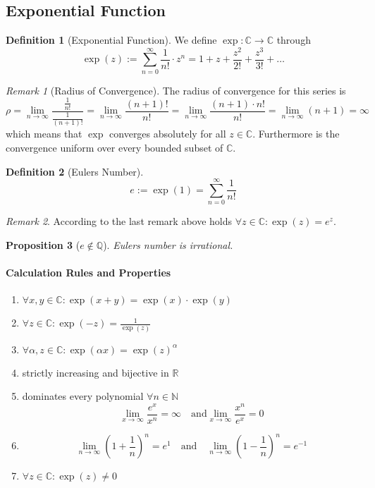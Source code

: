 \documentclass[english,titlepage]{uzhpub}
\theoremstyle{definition}
\newtheorem{definition}{Definition}[section]
\theoremstyle{plain}
\newtheorem{proposition}[definition]{Proposition}
\theoremstyle{remark}
\newtheorem*{remark}{Remark}
\theoremstyle{example}
\begin{document}
   \subsection{Exponential Function}
   \begin{definition}[Exponential Function]
      We define \(\exp: \mathbb{C} \to \mathbb{C}\) through
      \[\exp(z) := \sum_{n = 0}^\infty \frac{1}{n!} \cdot z^n = 1 + z + \frac{z^2}{2!} + \frac{z^3}{3!} + \ldots\]
   \end{definition}
   \begin{remark}[Radius of Convergence]
      The radius of convergence for this series is
      \[\rho = \lim_{n \to \infty} \frac{\frac{1}{n!}}{\frac{1}{(n+1)!}} = \lim_{n \to \infty} \frac{(n+1)!}{n!} = \lim_{n \to \infty} \frac{(n+1) \cdot n!}{n!} = \lim_{n \to \infty} (n+1) = \infty\]
      which means that \(\exp\) converges absolutely for all \(z \in \mathbb{C}\).
      Furthermore is the convergence uniform over every bounded subset of \(\mathbb{C}\).
   \end{remark}

   \begin{definition}[Eulers Number]
      \[e := \exp(1) = \sum_{n=0}^\infty \frac{1}{n!}\]
   \end{definition}
   \begin{remark}
      According to the last remark above holds \(\forall z \in \mathbb{C}: \exp(z) = e^z\).
   \end{remark}

   \begin{proposition}[\(e \not\in \mathbb{Q}\)]\label{pro:e_not_in_Q}
      Eulers number is irrational.
   \end{proposition}

   \paragraph{Calculation Rules and Properties}
   \begin{enumerate}[label=\roman*, align=Center]
      \item \(\forall x,y \in \mathbb{C}: \exp(x + y) = \exp(x) \cdot \exp(y)\)
      \item \(\forall z \in \mathbb{C}: \exp(-z) = \frac{1}{\exp(z)}\)
      \item \(\forall \alpha, z \in \mathbb{C}: \exp(\alpha x) = \exp(z)^\alpha\)
      \item strictly increasing and bijective in \(\mathbb{R}\)
      \item dominates every polynomial \(\forall n \in \mathbb{N}\)
         \[\lim_{x \to \infty} \frac{e^x}{x^n} = \infty \quad\text{and} \lim_{x \to \infty} \frac{x^n}{e^x} = 0\]
      \item
         \[\lim_{n \to \infty} \left(1 + \frac{1}{n}\right)^n = e^1 \quad\text{and}\quad \lim_{n \to \infty} \left(1 - \frac{1}{n}\right)^n = e^{-1}\]
      \item \(\forall z \in \mathbb{C}: \exp(z) \neq 0\)
   \end{enumerate}
\end{document}
